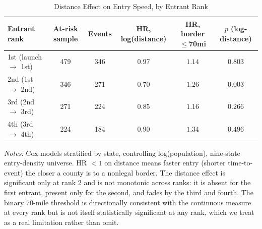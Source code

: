 \begin{table}[htbp]
\centering
\caption{Distance Effect on Entry Speed, by Entrant Rank}
\label{tab:entry_hazard_by_rank}
\begin{tabular}{lccccc}
\toprule
Entrant rank & At-risk sample & Events & HR, log(distance) & HR, border $\le$70mi & $p$ (log-distance) \\
\midrule
1st (launch $\to$ 1st) & 479 & 346 & $0.97$ & $1.14$ & $0.803$ \\
2nd (1st $\to$ 2nd) & 346 & 271 & $0.70$ & $1.26$ & $0.003$ \\
3rd (2nd $\to$ 3rd) & 271 & 224 & $0.85$ & $1.16$ & $0.266$ \\
4th (3rd $\to$ 4th) & 224 & 184 & $0.90$ & $1.34$ & $0.496$ \\
\bottomrule
\end{tabular}
\begin{minipage}{0.95\textwidth}
\vspace{0.3em}
\footnotesize
\textit{Notes:} Cox models stratified by state, controlling log(population), nine-state entry-density
universe. HR $<1$ on distance means faster entry (shorter time-to-event) the closer a county is to a
nonlegal border. The distance effect is significant only at rank 2 and is not monotonic across ranks: it is
absent for the first entrant, present only for the second, and fades by the third and fourth. The binary
70-mile threshold is directionally consistent with the continuous measure at every rank but is not itself
statistically significant at any rank, which we treat as a real limitation rather than omit.
\end{minipage}
\end{table}
